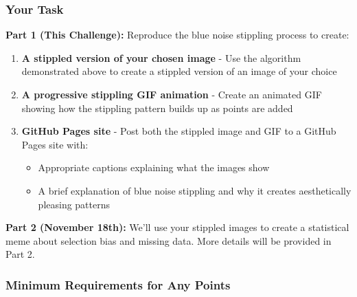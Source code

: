 \documentclass[
  letterpaper,
  DIV=11,
  numbers=noendperiod]{scrartcl}
\providecommand{\tightlist}{%
  \setlength{\itemsep}{0pt}\setlength{\parskip}{0pt}}
\begin{document}
\subsubsection{Your Task}\label{your-task}

\textbf{Part 1 (This Challenge):} Reproduce the blue noise stippling
process to create:

\begin{enumerate}
\def\labelenumi{\arabic{enumi}.}
\tightlist
\item
  \textbf{A stippled version of your chosen image} - Use the algorithm
  demonstrated above to create a stippled version of an image of your
  choice
\item
  \textbf{A progressive stippling GIF animation} - Create an animated
  GIF showing how the stippling pattern builds up as points are added
\item
  \textbf{GitHub Pages site} - Post both the stippled image and GIF to a
  GitHub Pages site with:

  \begin{itemize}
  \tightlist
  \item
    Appropriate captions explaining what the images show
  \item
    A brief explanation of blue noise stippling and why it creates
    aesthetically pleasing patterns
  \end{itemize}
\end{enumerate}

\textbf{Part 2 (November 18th):} We'll use your stippled images to
create a statistical meme about selection bias and missing data. More
details will be provided in Part 2.

\subsubsection{Minimum Requirements for Any
Points}\label{minimum-requirements-for-any-points}
\end{document}
